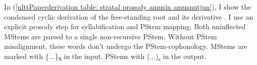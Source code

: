 \label{nlttPapersection: reduction: destressed reduction EA: pstem: apply: der}

In (\ref{nlttPaperderivation table: stratal prosody amusin amusnutjun}), I show the condensed cyclic derivation of the free-standing root \textit{} and its derivative \textit{}. I use an explicit prosody step for syllabification and PStem mapping. Both uninflected MStems are parsed to a single non-recursive PStem. Without PStem misalignment, these words don't undergo the PStem-cophonology. MStems are marked with \{...\}\textsubscript{S} in the input, PStems with (...)\textsubscript{s} in the output. 

	
		
	
	

















